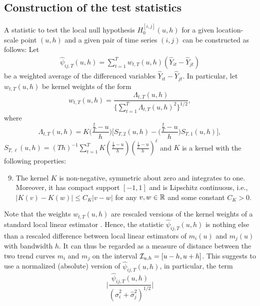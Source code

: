 \documentclass[12pt]{article}
\begin{document}
\subsection{Construction of the test statistics}\label{subsec:test:stat}


A statistic to test the local null hypothesis $H_0^{[i, j]}(u, h)$ for a given location-scale point $(u,h)$ and a given pair of time series $(i,j)$ can be constructed as follows: Let
\begin{align}
\widehat{\psi}_{ij, T}(u, h) = \sum\limits_{t=1}^T w_{t,T}(u, h)(\widehat{Y}_{it} - \widehat{Y}_{jt}) \label{eq:psi_hat_ij}
\end{align}
be a weighted average of the differenced variables $\widehat{Y}_{it} - \widehat{Y}_{jt}$. In particular, let $w_{t,T}(u, h)$ be kernel weights of the form
\begin{equation}\label{eq:weights}
w_{t,T}(u, h) = \frac{\Lambda_{t,T}(u, h)}{ \{\sum\nolimits_{t=1}^T \Lambda_{t,T}(u, h)^2 \}^{1/2} }, 
\end{equation}
where
\[ \Lambda_{t,T}(u, h) = K\Big(\frac{\frac{t}{T}-u}{h}\Big) \Big[ S_{T,2}(u, h) - \Big(\frac{\frac{t}{T}-u}{h}\Big) S_{T,1}(u, h) \Big], \]
$S_{T,\ell}(u, h) = (Th)^{-1} \sum\nolimits_{t=1}^T K(\frac{\frac{t}{T}-u}{h}) (\frac{\frac{t}{T}-u}{h})^\ell$ and $K$ is a kernel with the following properties: 
\begin{enumerate}[label=(C\arabic*),leftmargin=1.05cm,topsep=3pt]
\setcounter{enumi}{8}
\item \label{C-ker} The kernel $K$ is non-negative, symmetric about zero and integrates to one. Moreover, it has compact support $[-1,1]$ and is Lipschitz continuous, i.e., $|K(v) - K(w)| \le C_K |v-w|$ for any $v, w \in \mathbb{R}$ and some constant $C_K > 0$.
\end{enumerate}
Note that the weights $w_{t,T}(u,h)$ are rescaled versions of the kernel weights of a standard local linear estimator \citep{FanGijbels1996}. Hence, the statistic $\widehat{\psi}_{ij, T}(u, h)$ is nothing else than a rescaled difference between local linear estimators of $m_i(u)$ and $m_j(u)$ with bandwidth $h$. It can thus be regarded as a measure of distance between the two trend curves $m_i$ and $m_j$ on the interval $\mathcal{I}_{u, h} = [u-h, u+h]$. This suggests to use a normalized (absolute) version of $\widehat{\psi}_{ij, T}(u, h)$, in particular, the term 
\begin{equation}\label{eq:local-stat-without-correction}
\Big| \frac{\widehat{\psi}_{ij, T}(u, h)}{(\widehat{\sigma}_i^2 + \widehat{\sigma}_j^2)^{1/2}} \Big|
\end{equation}
\end{document}

